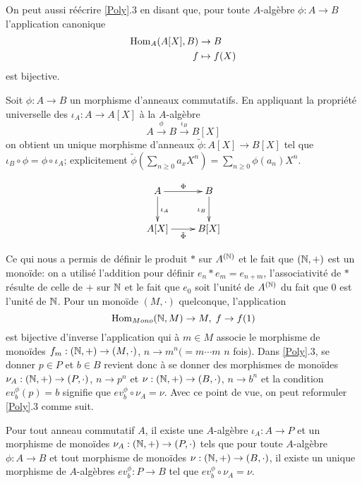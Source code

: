 On peut aussi réécrire \ref{Poly}.3 en disant que, pour toute $A$-algèbre
$\phi:A\rightarrow B$ l'application canonique
\begin{align*}
    \operatorname{Hom}_A(A[X],B) &\to B \\
    f &\mapsto f(X)
\end{align*}
est bijective.

Soit $\phi:A  \rightarrow B $ un morphisme  d'anneaux commutatifs. En
appliquant la propriété universelle des $\iota_A:A\rightarrow A[X]$  à la
$A$-algèbre $$A\overset{\phi}{\to} B\overset{\iota_B}{\to}B[X]$$ on obtient un
unique morphisme d'anneaux  $\tilde{\phi}:A[X]\rightarrow B[X]$ tel que
$\iota_B\circ \phi=\phi\circ \iota_A$; explicitement $\tilde{\phi}(\sum_{n\geq
0}a_xX^n)=\sum_{n\geq 0}\phi(a_n)X^n$.

    \[\xymatrix{ A\ar[r]^\Phi \ar[d]^{\iota_A} & B \ar[d]_{\iota_B} \\
    A[X]\ar[r]_{\tilde{\Phi}} & B[X] }\]

\begin{remarque}
    \label{RemarqueConstr} Ce qui nous a permis de définir le
    produit $*$ sur $A^{(\mathbb{N})}$ et le fait que $(\mathbb{N},+)$ est un monoïde: on a
    utilisé l'addition pour définir $e_n*e_m=e_{n+m}$, l'associativité de $*$
    résulte de celle de $+$ sur $\mathbb{N}$ et le fait que $e_0$ soit l'unité de
    $A^{(\mathbb{N})}$ du fait que $0$ est l'unité de $\mathbb{N}$.  Pour un monoïde
    $(M,\cdot)$ quelconque, l'application \[\operatorname{Hom}_{Mono}(\mathbb{N},M)\rightarrow M,\;
    f\rightarrow f(1)\] est bijective d'inverse l'application qui à $m\in M$
    associe le morphisme de monoïdes $f_m:(\mathbb{N},+)\rightarrow (M,\cdot)$,
    $n\rightarrow m^n(=m\cdots m$ $n$ fois). Dans \ref{Poly}.3, se donner $p\in
    P$ et $b\in B$ revient donc à se donner des morphismes de monoïdes
    $\nu_A:(\mathbb{N},+)\rightarrow (P,\cdot)$, $n\rightarrow p^n$ et
    $\nu:(\mathbb{N},+)\rightarrow (B,\cdot)$, $n\rightarrow b^n$ et la condition
    $ev^\phi_b(p)=b$ signifie que $ev^\phi_b\circ \nu_A=\nu$. Avec ce point de
    vue, on peut reformuler \ref{Poly}.3 comme suit.
\end{remarque}

\begin{lemme}
    Pour tout anneau commutatif $A$, il existe une $A$-algèbre $\iota_A:
    A\rightarrow P$ et un morphisme de monoïdes $\nu_A:(\mathbb{N},+)\rightarrow
    (P,\cdot)$ tels que pour toute $A$-algèbre $\phi: A\rightarrow B$ et tout
    morphisme de monoïdes $\nu:(\mathbb{N},+)\rightarrow (B,\cdot)$, il existe un
    unique  morphisme de $A$-algèbres $ev^\phi_b:P\rightarrow B$  tel que $
    ev^\phi_b\circ \nu_A=\nu$.  
\end{lemme}

